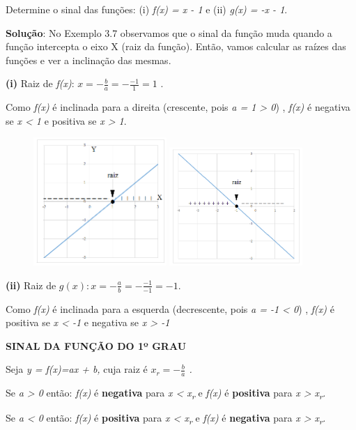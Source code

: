 \begin{texemplo}
Determine o sinal das funções: (i)  \textit{ f(x) = x - 1} e  (ii)  \textit{ g(x) = -x - 1}.

\textbf{Solução}: No Exemplo 3.7 observamos que o sinal da função muda quando a função intercepta o eixo X (raiz da função). Então, vamos calcular as raízes das funções e ver a inclinação das mesmas.

\textbf{(i)} Raiz de \textit{f(x)}:    \( x=-\frac{b}{a}=-\frac{-1}{1}=1 \) . 

Como \textit{f(x)} é inclinada para a direita (crescente, pois \textit{a = 1 > 0}) , \textit{f(x) } é negativa se \textit{x < 1} e positiva se \textit{x > 1}.

\begin{figure}[H]
	\includegraphics[width=0.45\textwidth]{capitulos/funcao_do_primeiro_grau/media/image14.png} 
	\includegraphics[width=0.45\textwidth]{capitulos/funcao_do_primeiro_grau/media/image15.png}
\end{figure}

\textbf{(ii)} Raiz de $g(x): x = -\frac{a}{b} = -\frac{-1}{-1} = -1$.

Como \textit{f(x)} é inclinada para a esquerda (decrescente, pois \textit{a = -1 < 0}) , \textit{f(x) } é positiva se \textit{x < -1} e negativa  se \textit{x > -1}  \qedsymbol{}
\end{texemplo}

\begin{caixa}
\textbf{SINAL DA FUNÇÃO DO 1º GRAU}

Seja \textit{y = f(x)=ax + b, }cuja raiz é\textit{  \( x_{r}=-\frac{b}{a} \)  .}

Se \textit{a > 0}  então:  \textit{f(x) }é \textbf{negativa } para\textit{ x < x\textsubscript{r}  }e  \textit{f(x) }é \textbf{positiva} para\textit{ x > x\textsubscript{r}.}

Se \textit{a < 0}  então:  \textit{f(x) }é \textbf{positiva } para\textit{ x < x\textsubscript{r}  }e  \textit{f(x) }é \textbf{negativa} para\textit{ x > x\textsubscript{r}.}
\end{caixa}

